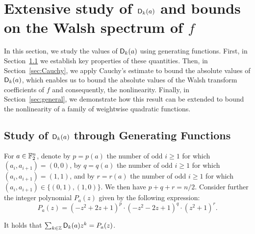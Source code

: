 \documentclass[11pt]{llncs}
\begin{document}









\section{Extensive study of $\Dnka nka$ and bounds on the Walsh spectrum of $f$}

In this section, we study the values of $\Dnka nka$ using generating functions. First, in Section~\ref{sec:genfunc} we establish key properties of these quantities. Then, in Section~\ref{sec:Cauchy}, we apply Cauchy's estimate to bound the absolute values of $\Dnka nka$, which enables us to bound the absolute values of the Walsh transform coefficients of $f$ and consequently, the nonlinearity.
Finally, in Section~\ref{sec:general}, we demonstrate how this result can be extended to bound the nonlinearity of a family of weightwise quadratic functions.











\subsection{Study of $\Dnka nka$ through Generating Functions}\label{sec:genfunc}

\begin{definition}\label{defi:P_a}
    For $a\in\F_2^n$, denote by $p=p(a)$ the number of odd $i\geq 1$ for which $(a_i,a_{i+1})=(0,0)$, by $q=q(a)$ the number of odd $i\geq 1$ for which $(a_i,a_{i+1})=(1,1)$, and by $r=r(a)$ the number of odd $i\geq 1$ for which $(a_i,a_{i+1})\in\{(0,1),(1,0)\}$. We then have $p+q+r=n/2$. Consider further the integer polynomial $P_a(z)$ given by the following expression:
    \[
    P_a(z)=(-z^2+2z+1)^{p}\cdot(-z^2-2z+1)^{q}\cdot(z^2+1)^{r}.
    \]
\end{definition}


\begin{proposition}\label{proposition:generating_fct}
	It holds that $\sum_{k\in\Z}\Dnka nka z^k= P_a(z)$.
\end{proposition}
\end{document}
